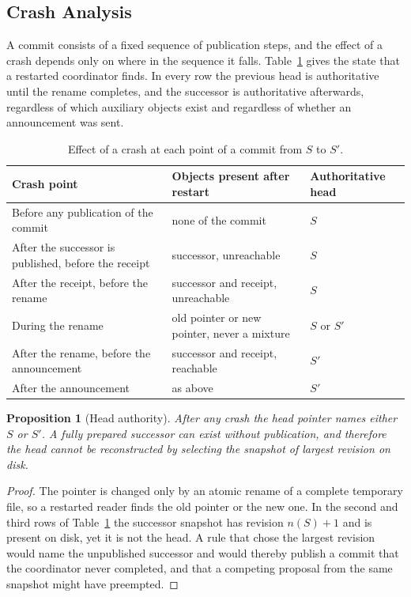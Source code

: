 \documentclass[11pt,a4paper]{article}
\theoremstyle{plain}
\newtheorem{proposition}[theorem]{Proposition}
\theoremstyle{definition}
\theoremstyle{remark}
\theoremstyle{definition}
\begin{document}
\subsection{Crash Analysis}

A commit consists of a fixed sequence of publication steps, and the effect of a crash depends only on where in the sequence it falls. Table~\ref{tab:crash} gives the state that a restarted coordinator finds. In every row the previous head is authoritative until the rename completes, and the successor is authoritative afterwards, regardless of which auxiliary objects exist and regardless of whether an announcement was sent.

\begin{table}[t]
\centering\small
\renewcommand{\arraystretch}{1.2}
\begin{tabular}{@{}p{4.9cm}p{4.6cm}p{2.9cm}@{}}
\toprule
Crash point & Objects present after restart & Authoritative head \\
\midrule
Before any publication of the commit & none of the commit & $S$ \\
After the successor is published, before the receipt & successor, unreachable & $S$ \\
After the receipt, before the rename & successor and receipt, unreachable & $S$ \\
During the rename & old pointer or new pointer, never a mixture & $S$ or $S'$ \\
After the rename, before the announcement & successor and receipt, reachable & $S'$ \\
After the announcement & as above & $S'$ \\
\bottomrule
\end{tabular}
\caption{Effect of a crash at each point of a commit from $S$ to $S'$.}
\label{tab:crash}
\end{table}

\begin{proposition}[Head authority]
\label{prop:headauth}
After any crash the head pointer names either $S$ or $S'$. A fully prepared successor can exist without publication, and therefore the head cannot be reconstructed by selecting the snapshot of largest revision on disk.
\end{proposition}

\begin{proof}
The pointer is changed only by an atomic rename of a complete temporary file, so a restarted reader finds the old pointer or the new one. In the second and third rows of Table~\ref{tab:crash} the successor snapshot has revision $n(S)+1$ and is present on disk, yet it is not the head. A rule that chose the largest revision would name the unpublished successor and would thereby publish a commit that the coordinator never completed, and that a competing proposal from the same snapshot might have preempted.
\end{proof}
\end{document}
